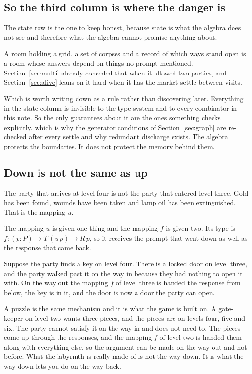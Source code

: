 \documentclass[11pt,a4paper]{article}
\begin{document}
\subsection{So the third column is where the danger is}

The state row is the one to keep honest, because state is what the algebra does not see and
therefore what the algebra cannot promise anything about.

A room holding a grid, a set of corpses and a record of which ways stand open is a room whose
answers depend on things no prompt mentioned. Section~\ref{sec:multi} already conceded that when it
allowed two parties, and Section~\ref{sec:alive} leans on it hard when it has the market settle
between visits.

\begin{alarmbox}
Which is worth writing down as a rule rather than discovering later. Everything in the state column
is invisible to the type system and to every combinator in this note. So the only guarantees about
it are the ones something checks explicitly, which is why the generator conditions of
Section~\ref{sec:graph} are re-checked after every settle and why redundant discharge exists. The
algebra protects the boundaries. It does not protect the memory behind them.
\end{alarmbox}

\subsection{Down is not the same as up}
\label{sec:updown}

The party that arrives at level four is not the party that entered level three. Gold has been
found, wounds have been taken and lamp oil has been extinguished. That is the mapping $u$.

The mapping $u$ is given one thing and the mapping $f$ is given two. Its type is
$f : (p : P) \to T\,(u\,p) \to R\,p$, so it receives the prompt that went down as well as the
response that came back.

Suppose the party finds a key on level four.
There is a locked door on level three, and the party walked past it on the way in because they
had nothing to open it with. On the way out the mapping $f$ of level three is handed the response
from below, the key is in it, and the door is now a door the party can open.

A puzzle is the same mechanism and it is what the game is built on. A gate-keeper on level two wants
three pieces, and the pieces are on levels four, five and six. The party cannot satisfy it on the
way in and does not need to. The pieces come up through the responses, and the mapping $f$ of level
two is handed them along with everything else, so the argument can be made on the way out and
not before. What the labyrinth is really made of is not the way down. It is what the way down
lets you do on the way back.
\end{document}

